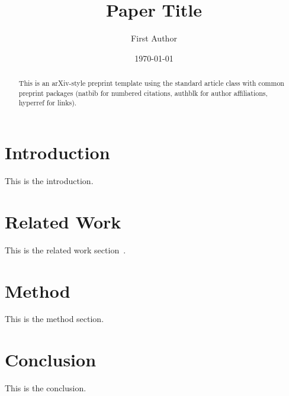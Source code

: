 \documentclass[11pt]{article}
\title{Paper Title}
\author[1]{First Author}
\affil[1]{Department, University, City, Country}
\date{\today}
\begin{document}
\maketitle

\begin{abstract}
This is an arXiv-style preprint template using the standard article class
with common preprint packages (natbib for numbered citations, authblk for
author affiliations, hyperref for links).
\end{abstract}

\section{Introduction}
This is the introduction.

\section{Related Work}
This is the related work section~\citep{example2024}.

\section{Method}
This is the method section.

\section{Conclusion}
This is the conclusion.



\end{document}
